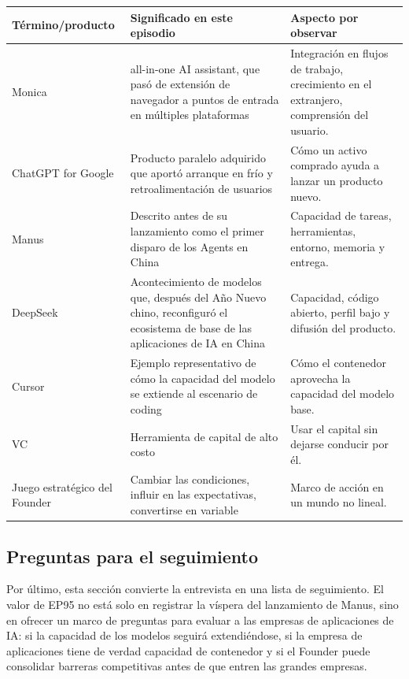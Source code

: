 \noindent\begin{tabularx}{\textwidth}{p{}p{}X}
\toprule
Término/producto & Significado en este episodio & Aspecto por observar \\
\midrule
Monica & all-in-one AI assistant, que pasó de extensión de navegador a puntos de entrada en múltiples plataformas & Integración en flujos de trabajo, crecimiento en el extranjero, comprensión del usuario. \\
ChatGPT for Google & Producto paralelo adquirido que aportó arranque en frío y retroalimentación de usuarios & Cómo un activo comprado ayuda a lanzar un producto nuevo. \\
Manus & Descrito antes de su lanzamiento como el primer disparo de los Agents en China & Capacidad de tareas, herramientas, entorno, memoria y entrega. \\
DeepSeek & Acontecimiento de modelos que, después del Año Nuevo chino, reconfiguró el ecosistema de base de las aplicaciones de IA en China & Capacidad, código abierto, perfil bajo y difusión del producto. \\
Cursor & Ejemplo representativo de cómo la capacidad del modelo se extiende al escenario de coding & Cómo el contenedor aprovecha la capacidad del modelo base. \\
VC & Herramienta de capital de alto costo & Usar el capital sin dejarse conducir por él. \\
Juego estratégico del Founder & Cambiar las condiciones, influir en las expectativas, convertirse en variable & Marco de acción en un mundo no lineal. \\
\bottomrule
\end{tabularx}

\subsection{Preguntas para el seguimiento}

Por último, esta sección convierte la entrevista en una lista de seguimiento. El valor de EP95 no está solo en registrar la víspera del lanzamiento de Manus, sino en ofrecer un marco de preguntas para evaluar a las empresas de aplicaciones de IA: si la capacidad de los modelos seguirá extendiéndose, si la empresa de aplicaciones tiene de verdad capacidad de contenedor y si el Founder puede consolidar barreras competitivas antes de que entren las grandes empresas.

